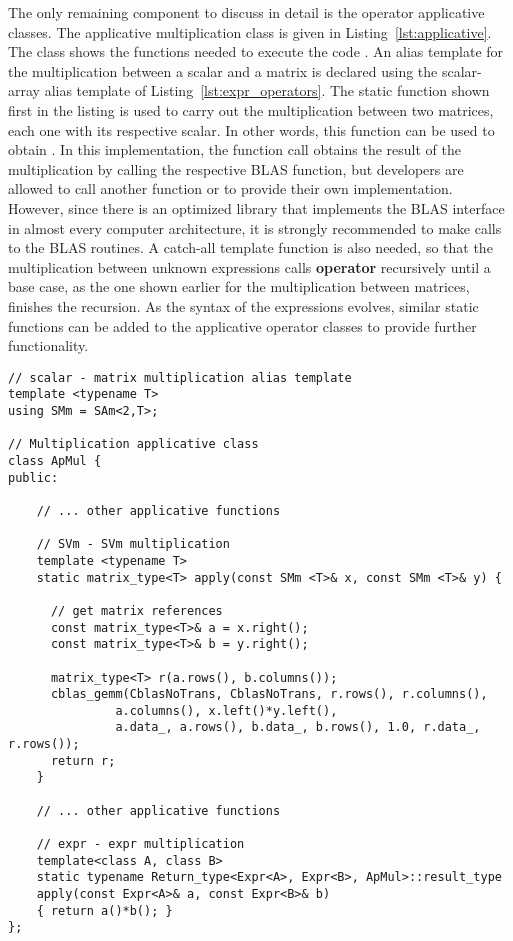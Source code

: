 \documentclass[11pt]{article}
\newcommand{\code}[1]{{\footnotesize\ttfamily{#1}}}
\newcommand\keywordd[1]{{\color{DarkOrchid}\footnotesize\ttfamily\textbf{#1}}}
\begin{document}
The only remaining component to discuss in detail is the operator applicative classes. The applicative multiplication class \code{ApMul} is given in Listing~\ref{lst:applicative}.
The class shows the functions needed to execute the code \code{matrix\_typedouble}\code{ C = alpha*A*B}. An alias template for the multiplication between a scalar and a matrix is declared using the scalar-array alias template of Listing~\ref{lst:expr_operators}.
The static function shown first in the listing is used to carry out the multiplication between two matrices, each one with its respective scalar. In other words, this function can be used to obtain . In this implementation, the function call obtains the result of the multiplication by calling the respective BLAS function, but developers are allowed to call another function or to provide their own implementation.
However, since there is an optimized library that implements the BLAS interface in almost every computer architecture, it is strongly recommended to make calls to the BLAS routines.
A catch-all template function is also needed, so that the multiplication between unknown expressions calls \keywordd{operator}\code{()} recursively until a base case, as the one shown earlier for the multiplication between matrices, finishes the recursion.
As the syntax of the expressions evolves, similar static functions can be added to the applicative operator classes to provide further functionality.
\begin{lstlisting}[caption={\code{ApMul} multiplication applicative class}, label=lst:applicative]
// scalar - matrix multiplication alias template
template <typename T>
using SMm = SAm<2,T>;

// Multiplication applicative class
class ApMul {
public:
    
    // ... other applicative functions
    
    // SVm - SVm multiplication
    template <typename T>
    static matrix_type<T> apply(const SMm <T>& x, const SMm <T>& y) {
    
      // get matrix references
      const matrix_type<T>& a = x.right();
      const matrix_type<T>& b = y.right();
      
      matrix_type<T> r(a.rows(), b.columns());
      cblas_gemm(CblasNoTrans, CblasNoTrans, r.rows(), r.columns(),
               a.columns(), x.left()*y.left(),
               a.data_, a.rows(), b.data_, b.rows(), 1.0, r.data_, r.rows());
      return r;
    }
    
    // ... other applicative functions

    // expr - expr multiplication
    template<class A, class B>
    static typename Return_type<Expr<A>, Expr<B>, ApMul>::result_type
    apply(const Expr<A>& a, const Expr<B>& b)
    { return a()*b(); }
};
\end{lstlisting}
\end{document}
